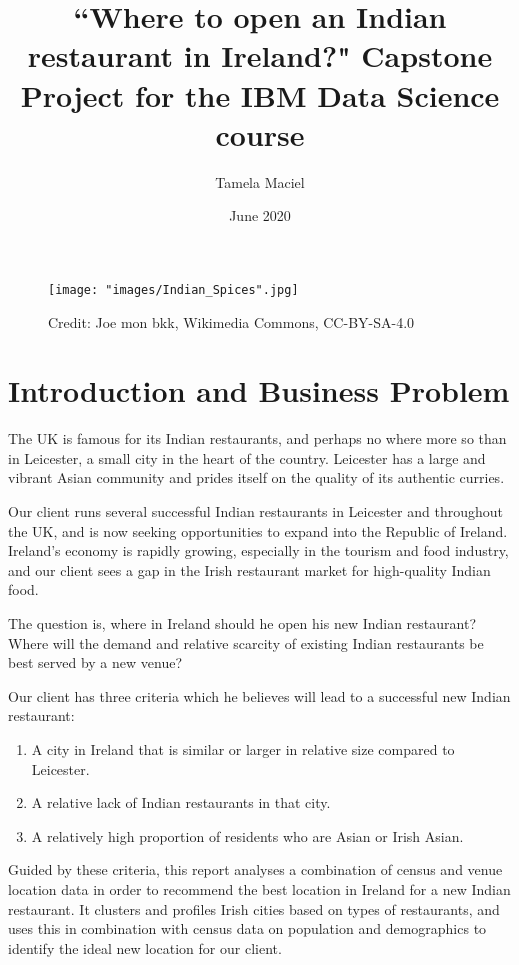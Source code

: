 \documentclass[a4paper,11pt]{article}
\begin{document}
%
   \title{``Where to open an Indian restaurant in Ireland?" Capstone Project for the IBM Data Science course}

   \author{Tamela Maciel}
          
   \date{June 2020}

   \maketitle
 

\begin{figure}[htb]
   \centering
   \texttt{[image: "images/Indian\_Spices".jpg]}
      \caption{Credit: Joe mon bkk, Wikimedia Commons, CC-BY-SA-4.0}
      \label{fig:spices}
\end{figure}
\section{Introduction and Business Problem}
The UK is famous for its Indian restaurants, and perhaps no where more so than in Leicester, a small city in the heart of the country. Leicester has a large and vibrant Asian community and prides itself on the quality of its authentic curries. 

Our client runs several successful Indian restaurants in Leicester and throughout the UK, and is now seeking opportunities to expand into the Republic of Ireland. Ireland's economy is rapidly growing, especially in the tourism and food industry, and our client sees a gap in the Irish restaurant market for high-quality Indian food. 

The question is, where in Ireland should he open his new Indian restaurant? Where will the demand and relative scarcity of existing Indian restaurants be best served by a new venue?

Our client has three criteria which he believes will lead to a successful new Indian restaurant:
\begin{enumerate}
	\item A city in Ireland that is similar or larger in relative size compared to Leicester.
	\item A relative lack of Indian restaurants in that city.
	\item A relatively high proportion of residents who are Asian or Irish Asian.
\end{enumerate}

Guided by these criteria, this report analyses a combination of census and venue location data in order to recommend the best location in Ireland for a new Indian restaurant. It clusters and profiles Irish cities based on types of restaurants, and uses this in combination with census data on population and demographics to identify the ideal new location for our client.
\end{document}
